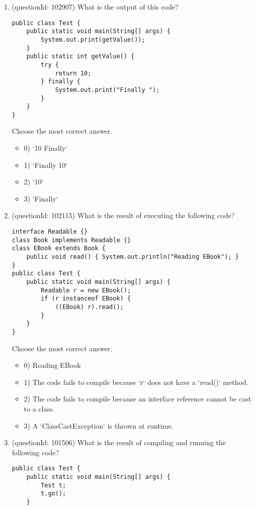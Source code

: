 \documentclass[12pt]{article}
\begin{document}
\begin{enumerate}[label=(\arabic*)]
\begin{itemize}
\end{itemize}
\item (questionId: 102907) What is the output of this code?
\begin{verbatim}
public class Test {
    public static void main(String[] args) {
        System.out.print(getValue());
    }
    public static int getValue() {
        try {
            return 10;
        } finally {
            System.out.print("Finally ");
        }
    }
}
\end{verbatim}
Choose the most correct answer. 
\begin{itemize}
\item 0) `10 Finally`

\item 1) `Finally 10`

\item 2) `10`

\item 3) `Finally`

\end{itemize}
\item (questionId: 102115) What is the result of executing the following code?\n\begin{verbatim}
interface Readable {}
class Book implements Readable {}
class EBook extends Book {
    public void read() { System.out.println("Reading EBook"); }
}
public class Test {
    public static void main(String[] args) {
        Readable r = new EBook();
        if (r instanceof EBook) {
            ((EBook) r).read();
        }
    }
}
\end{verbatim}
Choose the most correct answer. 
\begin{itemize}
\item 0) Reading EBook

\item 1) The code fails to compile because `r` does not have a `read()` method.

\item 2) The code fails to compile because an interface reference cannot be cast to a class.

\item 3) A `ClassCastException` is thrown at runtime.

\end{itemize}
\item (questionId: 101506) What is the result of compiling and running the following code?\n\begin{verbatim}
public class Test {
    public static void main(String[] args) {
        Test t;
        t.go();
    }


\end{verbatim}
\end{enumerate}
\end{document}
